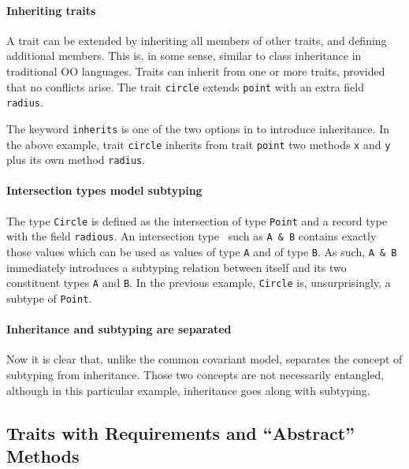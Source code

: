 \paragraph{Inheriting traits}
A trait can be extended by inheriting all members of
other traits, and defining additional members. This is, in some sense, similar
to class inheritance in traditional OO languages. Traits can inherit
from one or more traits, provided that
no conflicts arise. The trait \lstinline$circle$ extends
\lstinline{point} with an extra field \lstinline{radius}.

The keyword \lstinline{inherits} is one of the two options in \name to introduce
inheritance. In the above example, trait \lstinline{circle} inherits from trait
\lstinline{point} two methods \lstinline{x} and \lstinline{y} plus its own
method \lstinline{radius}. 

\paragraph{Intersection types model subtyping}
The type \lstinline{Circle} is defined as the intersection of type
\lstinline{Point} and a record type with the field \lstinline{radious}. An
intersection type~\cite{coppo1981functional,pottinger1980type} such as
\lstinline{A & B} contains exactly those values which can be used as values of
type \lstinline{A} and of type \lstinline{B}. As such, \lstinline{A & B}
immediately introduces a subtyping relation between itself and its two
constituent types \lstinline{A} and \lstinline{B}. In the previous example,
\lstinline{Circle} is, unsurprisingly, a subtype of \lstinline{Point}.

\paragraph{Inheritance and subtyping are separated}
Now it is clear that, unlike the common covariant
model, \name separates the concept of subtyping from inheritance. Those two
concepts are not necessarily entangled, although in this particular example,
inheritance goes along with subtyping.

\subsection{Traits with Requirements and ``Abstract'' Methods}

